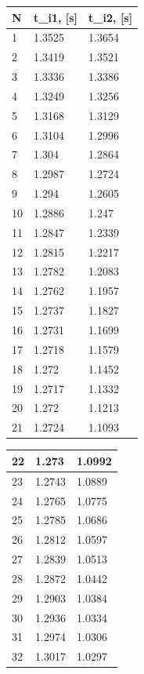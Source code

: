 \documentclass[12pt]{article}
\begin{document}
\begin{table}[h]
\begin{center}
\begin{tabular}{|l|l|l|} \hline
N &t_{i1}, [s] &t_{i2}, [s] \\\hline
1 &1.3525 &1.3654 \\\hline
2 &1.3419 &1.3521 \\\hline
3 &1.3336 &1.3386 \\\hline
4 &1.3249 &1.3256 \\\hline
5 &1.3168 &1.3129 \\\hline
6 &1.3104 &1.2996 \\\hline
7 &1.304 &1.2864 \\\hline
8 &1.2987 &1.2724 \\\hline
9 &1.294 &1.2605 \\\hline
10 &1.2886 &1.247 \\\hline
11 &1.2847 &1.2339 \\\hline
12 &1.2815 &1.2217 \\\hline
13 &1.2782 &1.2083 \\\hline
14 &1.2762 &1.1957 \\\hline
15 &1.2737 &1.1827 \\\hline
16 &1.2731 &1.1699 \\\hline
17 &1.2718 &1.1579 \\\hline
18 &1.272 &1.1452 \\\hline
19 &1.2717 &1.1332 \\\hline
20 &1.272 &1.1213 \\\hline
21 &1.2724 &1.1093 \\\hline
\end{tabular}
\hspace{2cm}
\begin{tabular}{|l|l|l|} \hline
22 &1.273 &1.0992 \\\hline
23 &1.2743 &1.0889 \\\hline
24 &1.2765 &1.0775 \\\hline
25 &1.2785 &1.0686 \\\hline
26 &1.2812 &1.0597 \\\hline
27 &1.2839 &1.0513 \\\hline
28 &1.2872 &1.0442 \\\hline
29 &1.2903 &1.0384 \\\hline
30 &1.2936 &1.0334 \\\hline
31 &1.2974 &1.0306 \\\hline
32 &1.3017 &1.0297 \\\hline

\end{tabular}
\end{center}
\end{table}
\end{document}
